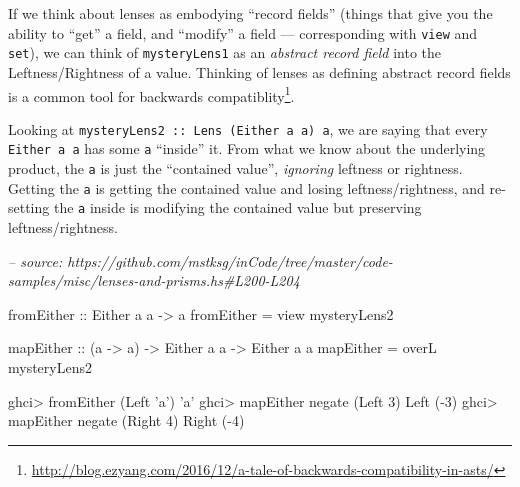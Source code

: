\documentclass[]{article}
\newenvironment{Shaded}{}{}
\newcommand{\CharTok}[1]{\textcolor[rgb]{0.25,0.44,0.63}{#1}}
\newcommand{\CommentTok}[1]{\textcolor[rgb]{0.38,0.63,0.69}{\textit{#1}}}
\newcommand{\DataTypeTok}[1]{\textcolor[rgb]{0.56,0.13,0.00}{#1}}
\newcommand{\DecValTok}[1]{\textcolor[rgb]{0.25,0.63,0.44}{#1}}
\newcommand{\FunctionTok}[1]{\textcolor[rgb]{0.02,0.16,0.49}{#1}}
\newcommand{\NormalTok}[1]{#1}
\newcommand{\OtherTok}[1]{\textcolor[rgb]{0.00,0.44,0.13}{#1}}
\renewcommand{\href}[2]{#2\footnote{\url{#1}}}
\begin{document}
If we think about lenses as embodying ``record fields'' (things that give you
the ability to ``get'' a field, and ``modify'' a field --- corresponding with
\texttt{view} and \texttt{set}), we can think of \texttt{mysteryLens1} as an
\emph{abstract record field} into the Leftness/Rightness of a value. Thinking of
lenses as defining abstract record fields is a
\href{http://blog.ezyang.com/2016/12/a-tale-of-backwards-compatibility-in-asts/}{common
tool for backwards compatiblity}.

Looking at \texttt{mysteryLens2\ ::\ Lens\textquotesingle{}\ (Either\ a\ a)\ a},
we are saying that every \texttt{Either\ a\ a} has some \texttt{a} ``inside''
it. From what we know about the underlying product, the \texttt{a} is just the
``contained value'', \emph{ignoring} leftness or rightness. Getting the
\texttt{a} is getting the contained value and losing leftness/rightness, and
re-setting the \texttt{a} inside is modifying the contained value but preserving
leftness/rightness.

\begin{Shaded}
\begin{Highlighting}[]
\CommentTok{-- source: https://github.com/mstksg/inCode/tree/master/code-samples/misc/lenses-and-prisms.hs#L200-L204}

\OtherTok{fromEither ::} \DataTypeTok{Either}\NormalTok{ a a }\OtherTok{->}\NormalTok{ a}
\NormalTok{fromEither }\FunctionTok{=}\NormalTok{ view mysteryLens2}

\OtherTok{mapEither ::}\NormalTok{ (a }\OtherTok{->}\NormalTok{ a) }\OtherTok{->} \DataTypeTok{Either}\NormalTok{ a a }\OtherTok{->} \DataTypeTok{Either}\NormalTok{ a a}
\NormalTok{mapEither }\FunctionTok{=}\NormalTok{ overL mysteryLens2}
\end{Highlighting}
\end{Shaded}

\begin{Shaded}
\begin{Highlighting}[]
\NormalTok{ghci}\FunctionTok{>}\NormalTok{ fromEither (}\DataTypeTok{Left} \CharTok{'a'}\NormalTok{)}
\CharTok{'a'}
\NormalTok{ghci}\FunctionTok{>}\NormalTok{ mapEither }\FunctionTok{negate}\NormalTok{ (}\DataTypeTok{Left} \DecValTok{3}\NormalTok{)}
\DataTypeTok{Left}\NormalTok{ (}\FunctionTok{-}\DecValTok{3}\NormalTok{)}
\NormalTok{ghci}\FunctionTok{>}\NormalTok{ mapEither }\FunctionTok{negate}\NormalTok{ (}\DataTypeTok{Right} \DecValTok{4}\NormalTok{)}
\DataTypeTok{Right}\NormalTok{ (}\FunctionTok{-}\DecValTok{4}\NormalTok{)}
\end{Highlighting}
\end{Shaded}
\end{document}

